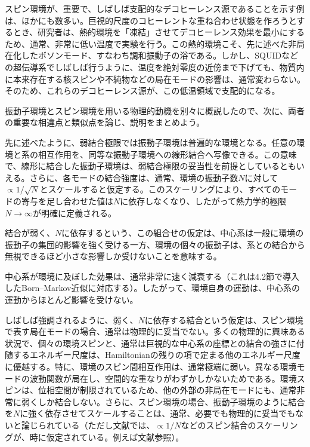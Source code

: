 スピン環境が、重要で、しばしば支配的なデコヒーレンス源であることを示す例は、ほかにも数多い。巨視的尺度のコヒーレントな重ね合わせ状態を作ろうとするとき、研究者は、熱的環境を「凍結」させてデコヒーレンス効果を最小にするため、通常、非常に低い温度で実験を行う。この熱的環境こそ、先に述べた非局在化したボソンモード、すなわち調和振動子の浴である。しかし、SQUIDなどの超伝導系でしばしば行うように、温度を絶対零度の近傍まで下げても、物質内に本来存在する核スピンや不純物などの局在モードの影響は、通常変わらない。そのため、これらのデコヒーレンス源が、この低温領域で支配的になる。

振動子環境とスピン環境を用いる物理的動機を別々に概説したので、次に、両者の重要な相違点と類似点を論じ、説明をまとめよう。

先に述べたように、弱結合極限では振動子環境は普遍的な環境となる。任意の環境と系の相互作用を、同等な振動子環境への線形結合へ写像できる\cite{ref211,ref212}。この意味で、線形に結合した振動子環境は、弱結合極限の妥当性を前提としているともいえる。さらに、各モードの結合強度は、通常、環境の振動子数$N$に対して$\propto1/\sqrt N$とスケールすると仮定する。このスケーリングにより、すべてのモードの寄与を足し合わせた値は$N$に依存しなくなり、したがって熱力学的極限$N\longrightarrow\infty$が明確に定義される。

結合が弱く、$N$に依存するという、この組合せの仮定は、中心系は一般に環境の振動子の集団的影響を強く受ける一方、環境の個々の振動子は、系との結合から無視できるほど小さな影響しか受けないことを意味する。

\hypertarget{srcpage:177}{}\label{srcpage:177}
中心系が環境に及ぼした効果は、通常非常に速く減衰する（これは4.2節で導入したBorn--Markov近似に対応する）。したがって、環境自身の運動は、中心系の運動からほとんど影響を受けない。

しばしば強調されるように\cite{ref199,ref200,ref210,ref215,ref216}、弱く、$N$に依存する結合という仮定は、スピン環境で表す局在モードの場合、通常は物理的に妥当でない。多くの物理的に興味ある状況で、個々の環境スピンと、通常は巨視的な中心系の座標との結合の強さに付随するエネルギー尺度は、Hamiltonianの残りの項で定まる他のエネルギー尺度に優越する。特に、環境のスピン間相互作用は、通常極端に弱い。異なる環境モードの波動関数が局在し、空間的な重なりがわずかしかないためである。環境スピンは、位相空間が制限されているため、他の外部の非局在モードにも、通常非常に弱くしか結合しない。さらに、スピン環境の場合、振動子環境のように結合を$N$に強く依存させてスケールすることは、通常、必要でも物理的に妥当でもないと論じられている\cite{ref199,ref200}（ただし文献では、$\propto1/N$などのスピン結合のスケーリングが、時に仮定されている。例えば文献\cite{ref217}参照）。

